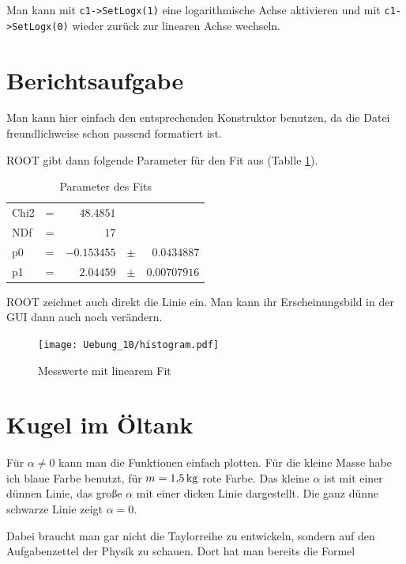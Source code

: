 Man kann mit \texttt{c1->SetLogx(1)} eine logarithmische Achse aktivieren und mit \texttt{c1->SetLogx(0)} wieder zurück zur linearen Achse wechseln.

\section{Berichtsaufgabe}

Man kann hier einfach den entsprechenden Konstruktor benutzen, da die Datei freundlichweise schon passend formatiert ist.


ROOT gibt dann folgende Parameter für den Fit aus (Tablle \ref{table:fit}).

\begin{table}[h]
\begin{center}
\begin{tabular}{lcrcr}
Chi2 & = & $48.4851$ &  \\ 
NDf & = & $17$ &  \\ 
p0 & = & $-0.153455$ & $\pm$ & $0.0434887$ \\ 
p1 & = & $2.04459$ & $\pm$ & $0.00707916$ \\ 
\end{tabular} 
\caption{Parameter des Fits}
\label{table:fit}
\end{center}
\end{table}

ROOT zeichnet auch direkt die Linie ein. Man kann ihr Erscheinungsbild in der GUI dann auch noch verändern.


\begin{figure}[h]
\begin{center}
\texttt{[image: Uebung\_10/histogram.pdf]}
\caption{Messwerte mit linearem Fit}
\end{center}
\end{figure}

\section{Kugel im Öltank}

Für $\alpha \neq 0$ kann man die Funktionen einfach plotten. Für die kleine Masse habe ich blaue Farbe benutzt, für $m=\unit[1{,}5]{kg}$ rote Farbe. Das kleine $\alpha$ ist mit einer dünnen Linie, das große $\alpha$ mit einer dicken Linie dargestellt. Die ganz dünne schwarze Linie zeigt $\alpha = 0$.

Dabei braucht man gar nicht die Taylorreihe zu entwickeln, sondern auf den Aufgabenzettel der Physik zu schauen. Dort hat man bereits die Formel

